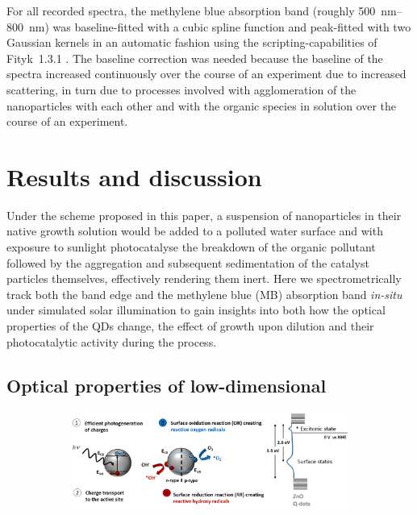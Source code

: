 \documentclass[9pt,twoside,twocolumn]{article}\usepackage{knitr}
\begin{document}
\begin{refsection}
For all recorded spectra, the methylene blue absorption band (roughly \qtyrange{500}{800}{\nm}) was baseline-fitted with a cubic spline function and peak-fitted with two Gaussian kernels in an automatic fashion using the scripting-capabilities of Fityk~1.3.1 \cite{Wojdyr2010}. 
The baseline correction was needed because the baseline of the spectra increased continuously over the course of an experiment due to increased scattering, in turn due to processes involved with agglomeration of the nanoparticles with each other and with the organic species in solution over the course of an experiment.





\section{Results and discussion}

Under the scheme proposed in this paper, a suspension of  nanoparticles in their native growth solution would be added to a polluted water surface and with exposure to sunlight photocatalyse the breakdown of the organic pollutant followed by the aggregation and subsequent sedimentation of the catalyst particles themselves, effectively rendering them inert.
Here we spectrometrically track both the  band edge and the methylene blue (MB) absorption band \textit{in-situ} under simulated solar illumination to gain insights into both how the optical properties of the QDs change, the effect of growth upon dilution and their photocatalytic activity during the process.



\subsection{Optical properties of low-dimensional }

\begin{figure}[tb]
\centering
\begin{subfigure}[b]{\linewidth}
\caption{}
\label{fig:schematic}
\includegraphics[width=\linewidth]{images/nanoparticle-redox}
\end{subfigure}\\%
\begin{subfigure}[b]{\linewidth}
\caption{}
\label{fig:solarlamp}
\begin{knitrout}\footnotesize
{}\color{fgcolor}


\end{knitrout}
\end{subfigure}
\end{figure}
\end{refsection}
\end{document}

